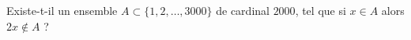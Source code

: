 Existe-t-il un ensemble $A \subset \{1, 2, \ldots, 3000\}$ de cardinal $2000$, tel que si $x \in A$ alors $2x \notin A$ ?
